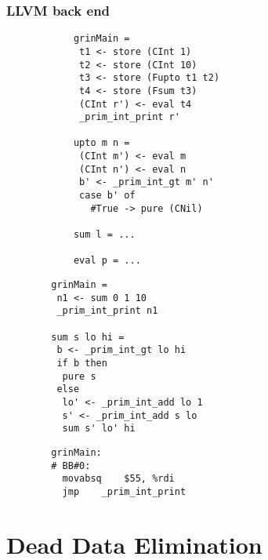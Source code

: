 \documentclass[bigger]{beamer}
\begin{document}
\begin{frame}[fragile]
\frametitle{LLVM back end}

	\hspace{-4cm}
	\begin{minipage}[t]{0.30\textwidth}
		\begin{verbatim}
			grinMain =
			 t1 <- store (CInt 1)
			 t2 <- store (CInt 10)
			 t3 <- store (Fupto t1 t2)
			 t4 <- store (Fsum t3)
			 (CInt r') <- eval t4
			 _prim_int_print r'

			upto m n =
			 (CInt m') <- eval m
			 (CInt n') <- eval n
			 b' <- _prim_int_gt m' n'
			 case b' of
			   #True -> pure (CNil)

			sum l = ...

			eval p = ...
		\end{verbatim}
	\end{minipage}
	\hspace{1.8cm}
	\pause
	\begin{minipage}[t]{0.30\textwidth}
		\begin{verbatim}
		grinMain =
		 n1 <- sum 0 1 10
		 _prim_int_print n1

		sum s lo hi =
		 b <- _prim_int_gt lo hi
		 if b then
		  pure s
		 else
		  lo' <- _prim_int_add lo 1
		  s' <- _prim_int_add s lo
		  sum s' lo' hi

		\end{verbatim}
	\end{minipage}
	\hspace{0.5cm}
	\pause
	\begin{minipage}[t]{0.30\textwidth}
		\begin{verbatim}
		grinMain:
		# BB#0:
		  movabsq    $55, %rdi
		  jmp    _prim_int_print
		\end{verbatim}
	\end{minipage}

\end{frame}

\section{Dead Data Elimination}
\end{document}
